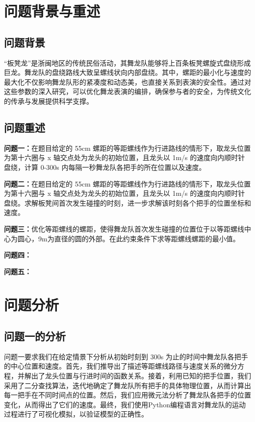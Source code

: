 \documentclass[a4paper]{article}
\begin{document}
	\clearpage %

	\section{问题背景与重述}
	\subsection{问题背景}
	“板凳龙”是浙闽地区的传统民俗活动，其舞龙队能够将上百条板凳螺旋式盘绕形成巨龙。舞龙队的盘绕路线大致呈螺线状向内部盘绕。其中，螺距的最小化与速度的最大化不仅影响舞龙队形的紧凑度和动态美，也直接关系到表演的安全性。通过对这些参数的深入研究，可以优化舞龙表演的编排，确保参与者的安全，为传统文化的传承与发展提供科学支撑。


	\subsection{问题重述}
		\textbf{问题一：}在题目给定的 55cm 螺距的等距螺线作为行进路线的情形下，取龙头位置为第十六圈与 x 轴交点处为龙头的初始位置，且龙头以 1m/s 的速度向内顺时针盘绕，计算 0-300s 内每隔一秒舞龙队各把手的所在位置以及速度。

		\textbf{问题二：}在题目给定的 55cm 螺距的等距螺线作为行进路线的情形下，取龙头位置为第十六圈与 x 轴交点处为龙头的初始位置，且龙头以 1m/s 的速度向内顺时针盘绕。求解板凳间首次发生碰撞的时刻，进一步求解该时刻各个把手的位置坐标和速度。

		\textbf{问题三：}优化等距螺线的螺距，使得舞龙队首次发生碰撞的位置位于以等距螺线中心为圆心，9m为直径的圆的外部。在此约束条件下求等距螺线螺距的最小值。

		\textbf{问题四：}

		\textbf{问题五：}

	\section{问题分析}
	\subsection{问题一的分析}
		问题一要求我们在给定情景下分析从初始时刻到 300s 为止的时间中舞龙队各把手的中心位置和速度。首先，我们推导出了描述等距螺线路径与速度关系的微分方程，并解出了龙头位置与行进时间的函数关系。接着，利用已知的把手位置，我们采用了二分查找算法，迭代地确定了舞龙队所有把手的具体物理位置，从而计算出每一把手在不同时间点的位置。然后，我们应用微元法分析了舞龙队各把手的位置变化，从而得出了它们的速度。最终，我们使用Python编程语言对舞龙队的运动过程进行了可视化模拟，以验证模型的正确性。
\end{document}
